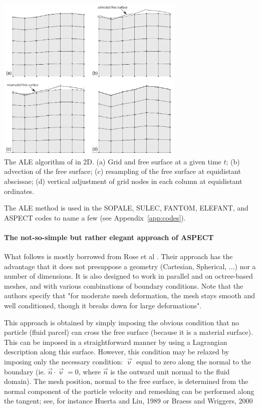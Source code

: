 \begin{center}
\includegraphics[width=9cm]{images/freesurface/ale2d}\\
 {\small The ALE algorithm of \cite{thie11} in 2D. 
(a) Grid and free surface at a given time $t$; 
(b) advection of the free surface; 
(c) resampling of the free surface at equidistant abscissae; 
(d) vertical adjustment of grid nodes in each column at equidistant ordinates.}
\end{center}

The ALE method is used in the SOPALE, SULEC, FANTOM, ELEFANT, and ASPECT codes to name a few
(see Appendix~\ref{app:codes}).


\paragraph{The not-so-simple but rather elegant approach of ASPECT}

What follows is mostly borrowed from Rose et al \cite{robh17}. Their approach 
has the advantage that it does not presuppose a geometry (Cartesian, Spherical, ...)
nor a number of dimensions. It is also designed to work in parallel and on octree-based
meshes, and with various combinations of boundary conditions.
Note that the authors specify that "for moderate mesh deformation, the mesh stays smooth and well
conditioned, though it breaks down for large deformations".


This approach is obtained by simply imposing the obvious condition 
that no particle (fluid parcel) can cross the free surface (because it is a material surface). 
This can be imposed in a straightforward manner by using a Lagrangian description along this surface. 
However, this condition may be relaxed by imposing only the necessary 
condition: $\vec{\upnu}$ equal to zero along the normal to the boundary 
(ie. $\vec{n}\cdot\vec{\upnu} = 0$, where $\vec{n}$ is the outward unit 
normal to the fluid domain). 
The mesh position, normal to the free surface, is determined from the normal component of 
the particle velocity 
and remeshing can be performed along the tangent; 
see, for instance Huerta and Liu, 1989 \cite{huli88} or Braess and Wriggers, 2000 \cite{brwr00} 

